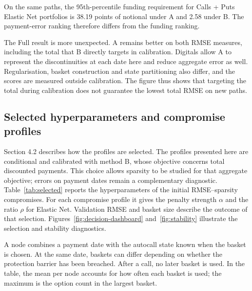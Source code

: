 \documentclass[12pt,a4paper]{article}
\newcommand{\1}{\mathbf{1}}
\begin{document}
On the same paths, the 95th-percentile funding requirement for Calls + Puts Elastic Net portfolios is 38.19 points of notional under A and 2.58 under B. The payment-error ranking therefore differs from the funding ranking.

The Full result is more unexpected. A remains better on both RMSE measures, including the total that B directly targets in calibration. Digitals allow A to represent the discontinuities at each date here and reduce aggregate error as well. Regularisation, basket construction and state partitioning also differ, and the scores are measured outside calibration. The figure thus shows that targeting the total during calibration does not guarantee the lowest total RMSE on new paths.

\subsection{Selected hyperparameters and compromise profiles}

Section 4.2 describes how the profiles are selected. The profiles presented here are conditional and calibrated with method B, whose objective concerns total discounted payments. This choice allows sparsity to be studied for that aggregate objective; errors on payment dates remain a complementary diagnostic. Table~\ref{tab:selected} reports the hyperparameters of the initial RMSE--sparsity compromises. For each compromise profile it gives the penalty strength $\alpha$ and the ratio $\rho$ for Elastic Net. Validation RMSE and basket size describe the outcome of that selection. Figures~\ref{fig:decision-dashboard} and~\ref{fig:stability} illustrate the selection and stability diagnostics.

A node combines a payment date with the autocall state known when the basket is chosen. At the same date, baskets can differ depending on whether the protection barrier has been breached. After a call, no later basket is used. In the table, the mean per node accounts for how often each basket is used; the maximum is the option count in the largest basket.
\end{document}
